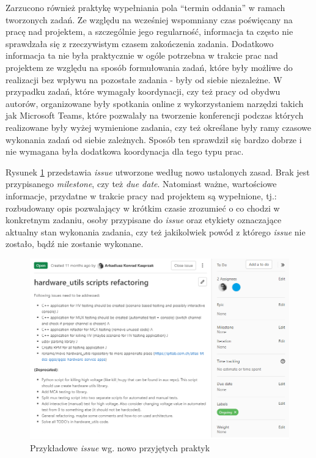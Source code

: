 Zarzucono również praktykę wypełniania pola “termin oddania” w ramach tworzonych zadań. Ze względu na  wcześniej wspomniany czas poświęcany na pracę nad projektem, a szczególnie jego regularność, informacja ta często nie sprawdzała się z rzeczywistym czasem zakończenia zadania. Dodatkowo informacja ta nie była praktycznie w ogóle potrzebna w trakcie prac nad projektem ze względu na sposób formułowania zadań, które były możliwe do realizacji bez wpływu na pozostałe zadania - były od siebie niezależne. W przypadku zadań, które wymagały koordynacji, czy też pracy od obydwu autorów, organizowane były spotkania online z wykorzystaniem narzędzi takich jak Microsoft Teams, które pozwalały na tworzenie konferencji podczas których realizowane były wyżej wymienione zadania, czy też określane były ramy czasowe wykonania zadań od siebie zależnych. Sposób ten sprawdził się bardzo dobrze i nie wymagana była dodatkowa koordynacja dla tego typu prac.

Rysunek \ref{fig:issue} przedstawia \emph{issue} utworzone według nowo ustalonych zasad. Brak jest przypisanego \emph{milestone}, czy też \emph{due date}. Natomiast ważne, wartościowe informacje, przydatne w trakcie pracy nad projektem są wypełnione, tj.: rozbudowany opis pozwalający w krótkim czasie zrozumieć o co chodzi w konkretnym zadaniu, osoby przypisane do \emph{issue} oraz etykiety oznaczające aktualny stan wykonania zadania, czy też jakikolwiek powód z którego \emph{issue} nie zostało, bądź nie zostanie wykonane.

\begin{figure}[H]
    \centering
    \includegraphics[width=\textwidth]{components/practices_res/issue}
    \caption{Przykładowe \emph{issue} wg. nowo przyjętych praktyk}
    \label{fig:issue}
\end{figure}


